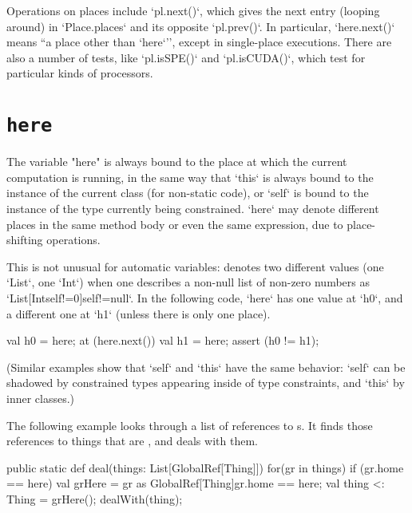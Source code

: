 Operations on places include \xcd`pl.next()`, which gives the next entry
(looping around) in \xcd`Place.places` and its opposite \xcd`pl.prev()`. In
particular, \xcd`here.next()` means ``a place other than \xcd`here`'', except
in single-place executions.
There are also a number of tests, like \xcd`pl.isSPE()` and 
\xcd`pl.isCUDA()`, which test for particular kinds of processors.




\section{{\tt here}}\label{Here}

The variable \xcd"here" is always bound to the place at which the current
computation is running, in the same way that \xcd`this` is always bound to the
instance of the current class (for non-static code), or \xcd`self` is bound to
the instance of the type currently being constrained.  
\xcd`here` may denote different places in the same method body or even the
same expression, due to
place-shifting operations.


This is not unusual for automatic variables:   denotes 
two different values (one \xcd`List`, one \xcd`Int`) 
when one describes a non-null list of non-zero numbers as
\xcd`List[Int{self!=0}]{self!=null}`. In the following 
code, \xcd`here` has one value at 
\xcd`h0`, and a different one at \xcd`h1` (unless there is only one place).
\begin{xten}
val h0 = here;
at (here.next()) {
  val h1 = here; 
  assert (h0 != h1);
}
\end{xten}
% 
\noindent
(Similar examples show that \xcd`self` and \xcd`this` have the same behavior:
\xcd`self` can be shadowed by constrained types appearing inside of type
constraints, and \xcd`this` by inner classes.)



The following example looks through a list of references to s.  
It finds those references to things that are , and deals with them.  
\begin{xten}
  public static def deal(things: List[GlobalRef[Thing]]) {
     for(gr in things) {
        if (gr.home == here) {
           val grHere = 
               gr as GlobalRef[Thing]{gr.home == here};
           val thing <: Thing = grHere();
           dealWith(thing);
        }
     }
  }
\end{xten}
% 

